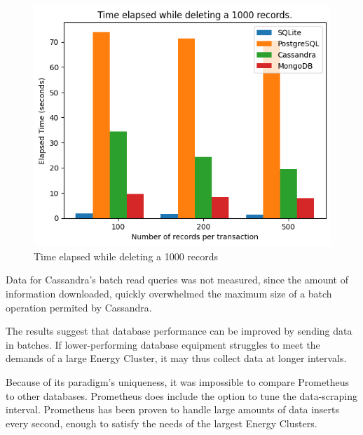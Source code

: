 \begin{figure}[htbp]
 \centering
 \includegraphics[width=1\textwidth]{gfx/delete}
 \caption{Time elapsed while deleting a 1000 records}
\end{figure}
\par Data for Cassandra's batch read queries was not measured, since the amount of information downloaded, quickly overwhelmed the maximum size of a batch operation permited by Cassandra.
\par The results suggest that database performance can be improved by sending data in batches. If lower-performing database equipment struggles to meet the demands of a large Energy Cluster, it may thus collect data at longer intervals.
\par Because of its paradigm's uniqueness, it was impossible to compare Prometheus to other databases. Prometheus does include the option to tune the data-scraping interval. Prometheus has been proven to handle large amounts of data inserts every second, enough to satisfy the needs of the largest Energy Clusters. \citep{prometheusSoundcloud}